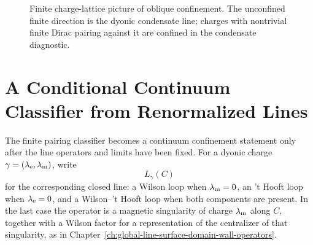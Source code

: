 \begin{figure}[H]
  \centering
  \caption{Finite charge-lattice picture of oblique confinement.  The
  unconfined finite direction is the dyonic condensate line; charges with
  nontrivial finite Dirac pairing against it are confined in the condensate
  diagnostic.}
  \label{fig:oblique-confinement-finite-lattice}
\end{figure}

\section{A Conditional Continuum Classifier from Renormalized Lines}
\label{sec:continuum-renormalized-line-confinement-criterion}

The finite pairing classifier becomes a continuum confinement statement only
after the line operators and limits have been fixed.  For a dyonic charge
\(\gamma=(\lambda_{\rm e},\lambda_{\rm m})\), write
\[
  L_\gamma(C)
\]
for the corresponding closed line: a Wilson loop when
\(\lambda_{\rm m}=0\), an 't Hooft loop when \(\lambda_{\rm e}=0\), and a
Wilson--'t Hooft loop when both components are present.  In the last case the
operator is a magnetic singularity of charge \(\lambda_{\rm m}\) along \(C\),
together with a Wilson factor for a representation of the centralizer of that
singularity, as in Chapter~\ref{ch:global-line-surface-domain-wall-operators}.

